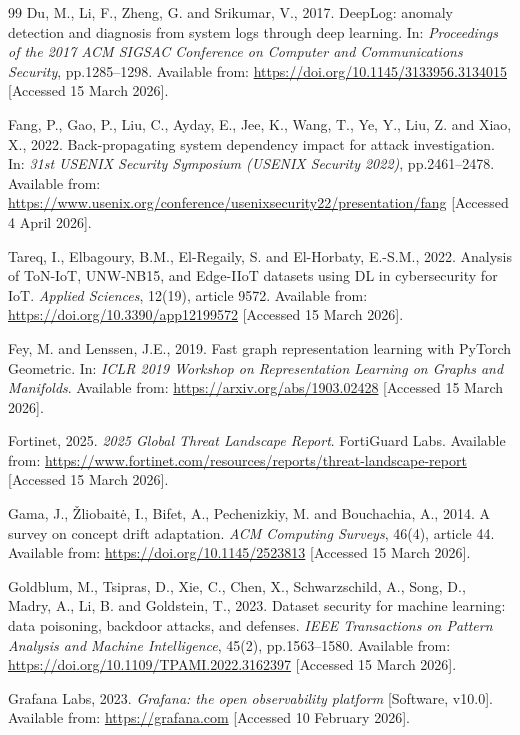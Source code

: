 \documentclass[12pt,a4paper]{report}
\begin{document}
\begin{thebibliography}{99}
Du, M., Li, F., Zheng, G. and Srikumar, V., 2017. DeepLog: anomaly detection and diagnosis from system logs through deep learning. In: \textit{Proceedings of the 2017 ACM SIGSAC Conference on Computer and Communications Security}, pp.1285--1298. Available from: \url{https://doi.org/10.1145/3133956.3134015} [Accessed 15 March 2026].

Fang, P., Gao, P., Liu, C., Ayday, E., Jee, K., Wang, T., Ye, Y., Liu, Z. and Xiao, X., 2022. Back-propagating system dependency impact for attack investigation. In: \textit{31st USENIX Security Symposium (USENIX Security 2022)}, pp.2461--2478. Available from: \url{https://www.usenix.org/conference/usenixsecurity22/presentation/fang} [Accessed 4 April 2026].

Tareq, I., Elbagoury, B.M., El-Regaily, S. and El-Horbaty, E.-S.M., 2022. Analysis of ToN-IoT, UNW-NB15, and Edge-IIoT datasets using DL in cybersecurity for IoT. \textit{Applied Sciences}, 12(19), article 9572. Available from: \url{https://doi.org/10.3390/app12199572} [Accessed 15 March 2026].

Fey, M. and Lenssen, J.E., 2019. Fast graph representation learning with PyTorch Geometric. In: \textit{ICLR 2019 Workshop on Representation Learning on Graphs and Manifolds}. Available from: \url{https://arxiv.org/abs/1903.02428} [Accessed 15 March 2026].

Fortinet, 2025. \textit{2025 Global Threat Landscape Report}. FortiGuard Labs. Available from: \url{https://www.fortinet.com/resources/reports/threat-landscape-report} [Accessed 15 March 2026].

Gama, J., \v{Z}liobait\.{e}, I., Bifet, A., Pechenizkiy, M. and Bouchachia, A., 2014. A survey on concept drift adaptation. \textit{ACM Computing Surveys}, 46(4), article 44. Available from: \url{https://doi.org/10.1145/2523813} [Accessed 15 March 2026].

Goldblum, M., Tsipras, D., Xie, C., Chen, X., Schwarzschild, A., Song, D., Madry, A., Li, B. and Goldstein, T., 2023. Dataset security for machine learning: data poisoning, backdoor attacks, and defenses. \textit{IEEE Transactions on Pattern Analysis and Machine Intelligence}, 45(2), pp.1563--1580. Available from: \url{https://doi.org/10.1109/TPAMI.2022.3162397} [Accessed 15 March 2026].

Grafana Labs, 2023. \textit{Grafana: the open observability platform} [Software, v10.0]. Available from: \url{https://grafana.com} [Accessed 10 February 2026].


\end{thebibliography}
\end{document}
